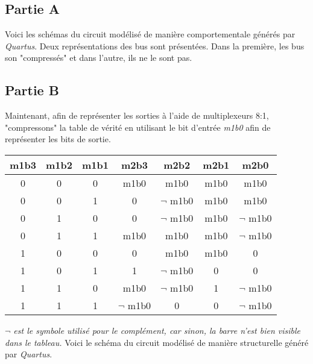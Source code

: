 \documentclass[12pt]{article}
\begin{document}
\pagebreak
\subsection{Partie A}
Voici les schémas du circuit modélisé de manière comportementale générés par \textsl{Quartus}. Deux représentations des bus sont présentées. Dans la première, les bus son "compressés" et dans l'autre, ils ne le sont pas.
\begin{figure}[H]
\end{figure}

\pagebreak
\subsection{Partie B}
Maintenant, afin de représenter les sorties à l'aide de multiplexeurs 8:1, "compressons" la table de vérité en utilisant le bit d'entrée \textsl{m1b0} afin de représenter les bits de sortie.
\singlespacing
\begin{center}
	\begin{tabular}{|c|c|c||c|c|c|c|}
		\hline
		m1b3 & m1b2 & m1b1 & m2b3         & m2b2         & m2b1 & m2b0         \\ \hline
		0    & 0    & 0    & m1b0         & m1b0         & m1b0 & m1b0         \\ \hline
		0    & 0    & 1    & 0            & $\lnot$ m1b0 & m1b0 & m1b0         \\ \hline
		0    & 1    & 0    & 0            & $\lnot$ m1b0 & m1b0 & $\lnot$ m1b0 \\ \hline
		0    & 1    & 1    & m1b0         & m1b0         & m1b0 & $\lnot$ m1b0 \\ \hline
		1    & 0    & 0    & 0            & m1b0         & m1b0 & 0            \\ \hline
		1    & 0    & 1    & 1            & $\lnot$ m1b0 & 0    & 0            \\ \hline
		1    & 1    & 0    & m1b0         & $\lnot$ m1b0 & 1    & $\lnot$ m1b0 \\ \hline
		1    & 1    & 1    & $\lnot$ m1b0 & 0            & 0    & $\lnot$ m1b0 \\ \hline
	\end{tabular}
\end{center}
\small{\textsl{$\lnot$ est le symbole utilisé pour le complément, car sinon, la barre n'est bien visible dans le tableau.}}
\doublespacing
Voici le schéma du circuit modélisé de manière structurelle généré par \textsl{Quartus}.
\end{document}
